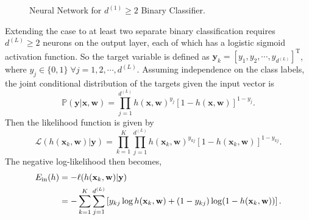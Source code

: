 \begin{figure}[!t]
\begin{subfigure}[c]{\textwidth}
\end{subfigure}
\caption[Neural Network for $d^{(1)}\geq 2$ Binary Classifier]{\sc Neural Network for $d^{(1)}\geq 2$ Binary Classifier.}
\label{fig:kloginn}
\end{figure}
Extending the case to at least two separate binary classification requires $d^{(L)}\geq 2$ neurons on the output layer, each of which has a logistic sigmoid activation function. So the target variable is defined as $\mathbf{y}_k=[y_1,y_2,\cdots,y_{d^{(L)}}]^{\mathrm{T}}$, where $y_j\in\{0,1\}\;\forall j=1,2,\cdots, d^{(L)}$. Assuming independence on the class labels, the joint conditional distribution of the targets given the input vector is
$$
\mathbb{P}(\mathbf{y}|\mathbf{x},\mathbf{w})=\prod_{j=1}^{d^{(L)}}h(\mathbf{x},\mathbf{w})^{y_j}\left[1-h(\mathbf{x},\mathbf{w})\right]^{1-y_j}.
$$
Then the likelihood function is given by
$$
\mathcal{L}(h(\mathbf{x}_k,\mathbf{w})|\mathbf{y})=\prod_{k=1}^{K}\prod_{j=1}^{d^{(L)}}h(\mathbf{x}_{k},\mathbf{w})^{y_{kj}}\left[1-h(\mathbf{x}_{k},\mathbf{w})\right]^{1-y_{kj}}.
$$
The negative log-likelihood then becomes,
\begin{align}
E_{\mathrm{in}}(h)&=-\ell (h(\mathbf{x}_{k},\mathbf{w})|\mathbf{y})\nonumber\\
&=-\sum_{k=1}^{K}\sum_{j=1}^{d^{(L)}}\left[y_{kj}\log h(\mathbf{x}_{k},\mathbf{w})+(1-y_{kj})\log(1-h(\mathbf{x}_{k},\mathbf{w}))\right].\label{eq:mlogitein}
\end{align}

